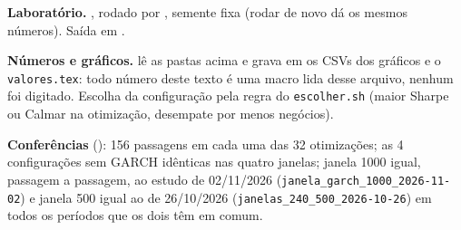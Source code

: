 \documentclass[11pt,a4paper]{article}
\begin{document}
\textbf{Laboratório.} , rodado por
, semente fixa (rodar de novo dá os mesmos números). Saída em
.

\textbf{Números e gráficos.}  lê as pastas acima e grava em
 os CSVs dos gráficos e o \texttt{valores.tex}: todo número deste texto é uma macro lida desse arquivo,
nenhum foi digitado. Escolha da configuração pela regra do \texttt{escolher.sh} (maior Sharpe ou Calmar na
otimização, desempate por menos negócios).

\textbf{Conferências} (): 156 passagens em cada uma das 32 otimizações; as 4
configurações sem GARCH idênticas nas quatro janelas; janela 1000 igual, passagem a passagem, ao estudo de
02/11/2026 (\texttt{janela\_garch\_1000\_2026-11-02}) e janela 500 igual ao de 26/10/2026
(\texttt{janelas\_240\_500\_2026-10-26}) em todos os períodos que os dois têm em comum.
\end{document}

